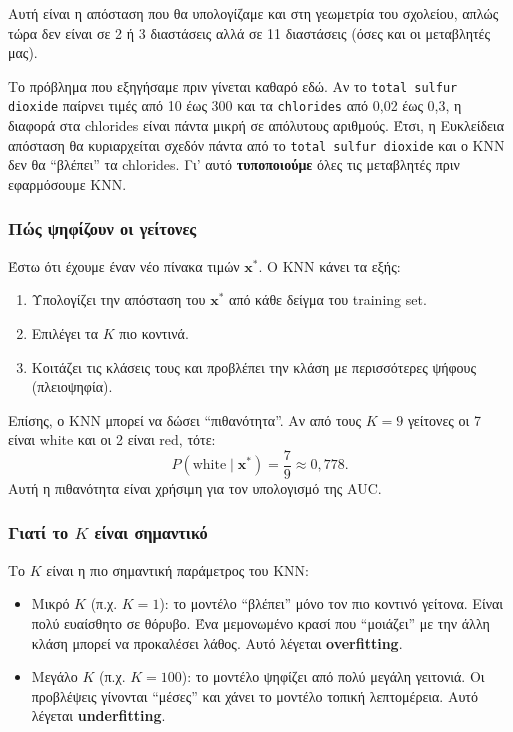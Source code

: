 \documentclass[11pt,a4paper]{article}
\newcommand{\code}[1]{\texttt{#1}}
\begin{document}
Αυτή είναι η απόσταση που θα υπολογίζαμε και στη γεωμετρία του σχολείου,
απλώς τώρα δεν είναι σε 2 ή 3 διαστάσεις αλλά σε 11 διαστάσεις (όσες και
οι μεταβλητές μας).

Το πρόβλημα που εξηγήσαμε πριν γίνεται καθαρό εδώ. Αν το \code{total
sulfur dioxide} παίρνει τιμές από 10 έως 300 και τα \code{chlorides} από
0,02 έως 0,3, η διαφορά στα chlorides είναι πάντα μικρή σε απόλυτους
αριθμούς. Έτσι, η Ευκλείδεια απόσταση θα κυριαρχείται σχεδόν πάντα από το
\code{total sulfur dioxide} και ο KNN δεν θα ``βλέπει'' τα chlorides.
Γι' αυτό \textbf{τυποποιούμε} όλες τις μεταβλητές πριν εφαρμόσουμε KNN.

\subsubsection{Πώς ψηφίζουν οι γείτονες}

Έστω ότι έχουμε έναν νέο πίνακα τιμών \(\mathbf{x}^\ast\). Ο KNN κάνει τα
εξής:
\begin{enumerate}
    \item Υπολογίζει την απόσταση του \(\mathbf{x}^\ast\) από κάθε δείγμα
    του training set.
    \item Επιλέγει τα \(K\) πιο κοντινά.
    \item Κοιτάζει τις κλάσεις τους και προβλέπει την κλάση με
    περισσότερες ψήφους (πλειοψηφία).
\end{enumerate}

Επίσης, ο KNN μπορεί να δώσει ``πιθανότητα''. Αν από τους \(K=9\)
γείτονες οι 7 είναι white και οι 2 είναι red, τότε:
\[
P(\text{white} \mid \mathbf{x}^\ast) = \frac{7}{9} \approx 0{,}778.
\]
Αυτή η πιθανότητα είναι χρήσιμη για τον υπολογισμό της AUC.

\subsubsection{Γιατί το \(K\) είναι σημαντικό}

Το \(K\) είναι η πιο σημαντική παράμετρος του KNN:
\begin{itemize}
    \item Μικρό \(K\) (π.χ. \(K=1\)): το μοντέλο ``βλέπει'' μόνο τον πιο
    κοντινό γείτονα. Είναι πολύ ευαίσθητο σε θόρυβο. Ένα μεμονωμένο
    κρασί που ``μοιάζει'' με την άλλη κλάση μπορεί να προκαλέσει λάθος.
    Αυτό λέγεται \textbf{overfitting}.
    \item Μεγάλο \(K\) (π.χ. \(K=100\)): το μοντέλο ψηφίζει από πολύ
    μεγάλη γειτονιά. Οι προβλέψεις γίνονται ``μέσες'' και χάνει το μοντέλο
    τοπική λεπτομέρεια. Αυτό λέγεται \textbf{underfitting}.
\end{itemize}
\end{document}
